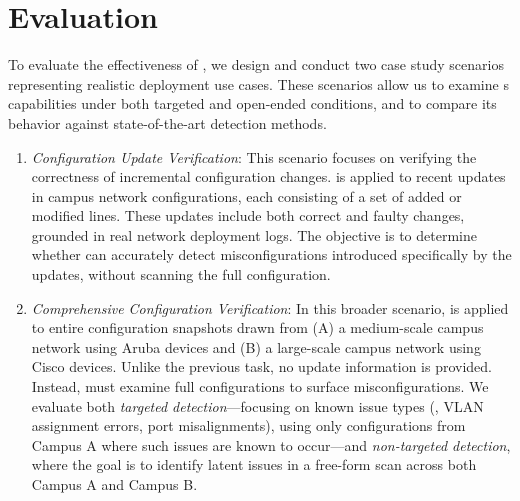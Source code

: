 \section{Evaluation}
\label{sec\:eval}
To evaluate the effectiveness of \sysname{}, we design and conduct two case study scenarios representing realistic deployment use cases. These scenarios allow us to examine \sysname{}\textquotesingle s capabilities under both targeted and open-ended conditions, and to compare its behavior against state-of-the-art detection methods.

\begin{enumerate}
\item \textit{Configuration Update Verification}: This scenario focuses on verifying the correctness of incremental configuration changes. \sysname{} is applied to recent updates in campus network configurations, each consisting of a set of added or modified lines. These updates include both correct and faulty changes, grounded in real network deployment logs. The objective is to determine whether \sysname{} can accurately detect misconfigurations introduced specifically by the updates, without scanning the full configuration.

\item \textit{Comprehensive Configuration Verification}: In this broader scenario, \sysname{} is applied to entire configuration snapshots drawn from (A) a medium-scale campus network using Aruba devices and (B) a large-scale campus network using Cisco devices. Unlike the previous task, no update information is provided. Instead, \sysname{} must examine full configurations to surface misconfigurations. We evaluate both \textit{targeted detection}—focusing on known issue types (\eg, VLAN assignment errors, port misalignments), using only configurations from Campus A where such issues are known to occur—and \textit{non-targeted detection}, where the goal is to identify latent issues in a free-form scan across both Campus A and Campus B.

\end{enumerate}

